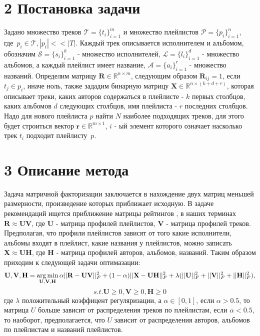 \documentclass[12pt,twoside]{article}
\begin{document}
\section{2 Постановка задачи}

{Задано множество треков $\mathcal{T} = \{t_i\}_{i=1}^m$ и множество плейлистов $\mathcal{P} = \{p_i\}_{i=1}^{n}$, где~$p_i \in \mathcal{T}, |p_i| << |T|$. Каждый трек описывается исполнителем и альбомом, обозначим $\mathcal{S} = \{s_i\}_{i=1}^{k}$ - множество исполнителей, $\mathcal{L} = \{l_i\}_{i=1}^d$ - множество альбомов, а каждый плейлист имеет название, $\mathcal{A} = \{a_i\}_{i=1}^{r}$ - множество названий. Определим матрицу $\mathbf{R} \in \mathbb{R}^{n \times m}$, следующим образом $\mathbf{R}_{ij} = 1$, если $t_j \in p_i$, иначе ноль, также зададим бинарную матрицу $\mathbf{X} \in \mathbb{R}^{n \times (k + d + r)}$, которая описывает треки, каких авторов содержаться в плейлисте - $k$ первых столбцов, каких альбомов $d$ следующих столбцов, имя плейлиста - $r$ последних столбцов. Надо для нового плейлиста $p$ найти $N$ наиболее подходящих треков, для этого будет строиться вектор $\mathbf{r} \in \mathbb{R}^{m \times 1}$, $i$ - ый элемент которого означает насколько трек $t_i$ подходит плейлисту~$p$.}

\section{3 Описание метода}

{Задача матричной факторизации заключается в нахождение двух матриц меньшей размерности, произведение которых приближает исходную. В задаче рекомендаций ищется приближение матрицы рейтингов , в наших терминах  $\mathbf{R} \approx \mathbf{UV}$, где $\mathbf{U}$ - матрица профилей плейлистов, $\mathbf{V}$ - матрица профилей треков. Предполагая, что профили плейлистов зависят от того какие исполнители, альбомы входят в плейлист, какие названия у плейлистов, можно записать $\mathbf{X} \approx \mathbf{UH}$, где $\mathbf{H}$ - матрица профилей авторов, альбомов, названий. Таким образом приходим к следующей задачи оптимазации:
$$\mathbf{U, V, H} = \argmin_{\mathbf{U, V, H}}\alpha||\mathbf{R} - \mathbf{UV}||_F^2 +(1 - \alpha) ||\mathbf{X} - \mathbf{UH}||_F^2 + \lambda(||\mathbf{U}||_F^2 + ||\mathbf{V}||_F^2 + ||\mathbf{H}||_F^2),$$
$$ s.t. \mathbf{U} \geq 0,  \mathbf{V} \geq 0,  \mathbf{H} \geq 0$$
где $\lambda$ положительный коэффицент регуляризации, а $\alpha \in [0, 1]$, если $\alpha > 0.5$, то матрица $U$ больше зависит от распределения треков по плейлистам, если $\alpha < 0.5$, то наоборот, предполагается, что $U$ зависит от распределения авторов, альбомов по плейлистам и названий плейлистов. }
\end{document}
